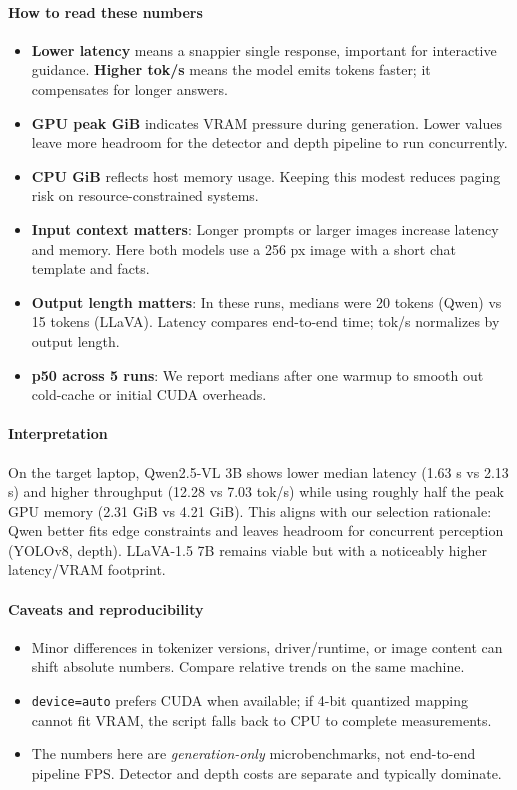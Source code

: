 \documentclass[11pt,a4paper]{article}
\newcommand{\code}[1]{\texttt{#1}}
\begin{document}
\paragraph{How to read these numbers}
\begin{itemize}[leftmargin=*]
    \item \textbf{Lower latency} means a snappier single response, important for interactive guidance. \textbf{Higher tok/s} means the model emits tokens faster; it compensates for longer answers.
    \item \textbf{GPU peak GiB} indicates VRAM pressure during generation. Lower values leave more headroom for the detector and depth pipeline to run concurrently.
    \item \textbf{CPU GiB} reflects host memory usage. Keeping this modest reduces paging risk on resource-constrained systems.
    \item \textbf{Input context matters}: Longer prompts or larger images increase latency and memory. Here both models use a 256 px image with a short chat template and facts.
    \item \textbf{Output length matters}: In these runs, medians were 20 tokens (Qwen) vs 15 tokens (LLaVA). Latency compares end-to-end time; tok/s normalizes by output length.
    \item \textbf{p50 across 5 runs}: We report medians after one warmup to smooth out cold-cache or initial CUDA overheads.
\end{itemize}

\paragraph{Interpretation} On the target laptop, Qwen2.5-VL 3B shows lower median latency (1.63 s vs 2.13 s) and higher throughput (12.28 vs 7.03 tok/s) while using roughly half the peak GPU memory (2.31 GiB vs 4.21 GiB). This aligns with our selection rationale: Qwen better fits edge constraints and leaves headroom for concurrent perception (YOLOv8, depth). LLaVA-1.5 7B remains viable but with a noticeably higher latency/VRAM footprint.

\paragraph{Caveats and reproducibility}
\begin{itemize}[leftmargin=*]
    \item Minor differences in tokenizer versions, driver/runtime, or image content can shift absolute numbers. Compare relative trends on the same machine.
    \item \code{device=auto} prefers CUDA when available; if 4-bit quantized mapping cannot fit VRAM, the script falls back to CPU to complete measurements.
    \item The numbers here are \emph{generation-only} microbenchmarks, not end-to-end pipeline FPS. Detector and depth costs are separate and typically dominate.
\end{itemize}
\end{document}
